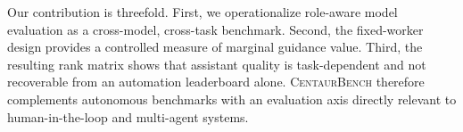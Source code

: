 Our contribution is threefold. First, we operationalize role-aware model
evaluation as a cross-model, cross-task benchmark. Second, the fixed-worker
design provides a controlled measure of marginal guidance value. Third, the
resulting rank matrix shows that assistant quality is task-dependent and not
recoverable from an automation leaderboard alone. \textsc{CentaurBench}
therefore complements autonomous benchmarks with an evaluation axis directly
relevant to human-in-the-loop and multi-agent systems.
